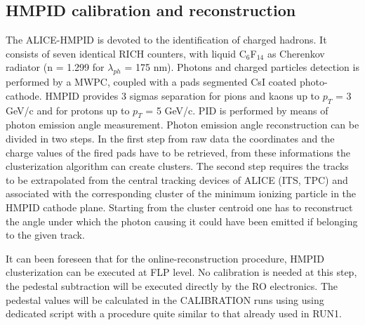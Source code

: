 \subsection{HMPID calibration and reconstruction}
\label{HMPID:FLP}

The ALICE-HMPID is devoted to the identification of charged hadrons. It consists of seven identical RICH counters,
with liquid C$_{6}$F$_{14}$ as Cherenkov radiator (n = 1.299 for $\lambda_{ph}$ = 175 nm). Photons and charged particles detection is performed by a MWPC, coupled with a pads 
segmented CsI coated photo-cathode. HMPID provides 3 sigmas separation for pions and kaons up to $p_T$ = 3 GeV/c and for protons up to $p_T$ = 5 GeV/c. PID is performed 
by means of photon emission angle measurement. Photon emission angle reconstruction can be divided in two steps. In the first step from raw data the coordinates and 
the charge values of the fired pads have to be retrieved, from these informations the clusterization algorithm can create clusters. 
The second step requires the tracks to be extrapolated from the central tracking devices of ALICE (ITS, TPC) and associated with the corresponding cluster of the minimum
ionizing particle in the HMPID cathode plane. Starting from the cluster centroid one has to reconstruct the angle under which the photon causing it could have been emitted if belonging to the given track.

It can been foreseen that for the online-reconstruction procedure, HMPID clusterization can be executed at FLP level. No calibration is needed at this step, the pedestal subtraction will be executed directly by the RO electronics. The pedestal values will be calculated 
in the CALIBRATION runs using using dedicated script with a procedure quite similar to that already used in RUN1. 
 
